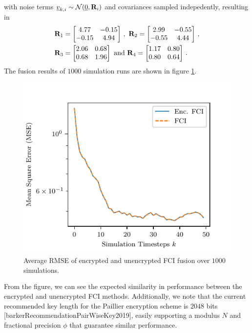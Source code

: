 with noise terms ${\underline{v}}_{k,i} \sim \mathcal{N}({\underline{0}}, {{\mathbf{R}}}_i)$ and covariances sampled indepedently, resulting in
\begin{equation}
    \begin{split}
        &\mat{R}_1 = 
        \begin{bmatrix}
            4.77 & -0.15\\
            -0.15 & 4.94
        \end{bmatrix}\,,\ 
        \mat{R}_2 = 
        \begin{bmatrix}
            2.99 & -0.55\\
            -0.55 & 4.44
        \end{bmatrix}\,,\\
        &\mat{R}_3 = 
        \begin{bmatrix}
            2.06 & 0.68\\
            0.68 & 1.96
        \end{bmatrix}\text{ and }
        \mat{R}_4 = 
        \begin{bmatrix}
            1.17 & 0.80\\
            0.80 & 0.64
        \end{bmatrix}\,.
    \end{split}
\end{equation}
The fusion results of $1000$ simulation runs are shown in figure \ref{fig:sim_error_plot}. 
\begin{figure}[htbp]
    \centering
    \includegraphics{figures/sim_error_plot.pdf}
    \caption{Average RMSE of encrypted and unencrypted FCI fusion over $1000$ simulations.}
    \label{fig:sim_error_plot}
\end{figure}
From the figure, we can see the expected similarity in performance between the encrypted and unencrypted FCI methods. Additionally, we note that the current recommended key length for the Paillier encryption scheme is $2048$ bits [barkerRecommendationPairWiseKey2019], easily supporting a modulus $N$ and fractional precision $\phi$ that guarantee similar performance.

